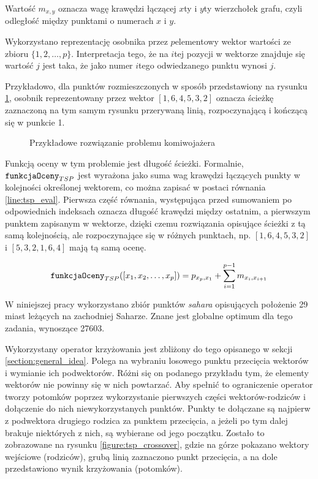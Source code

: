 \documentclass[./FM_mgr.tex]{subfiles}
\begin{document}
Wartość $m_{x, y}$ oznacza wagę krawędzi łączącej $x$ty i $y$ty wierzchołek grafu, czyli odległość między punktami o numerach $x$ i $y$.

Wykorzystano reprezentację osobnika przez $p$elementowy wektor wartości ze zbioru $\{ 1, 2, \ldots, p \}$.
Interpretacja tego, że na $i$tej pozycji w wektorze znajduje się wartość $j$ jest taka, że jako numer $i$tego odwiedzanego punktu wynosi $j$.

Przykładowo, dla punktów rozmieszczonych w sposób przedstawiony na rysunku \ref{figure:tsp_example}, osobnik reprezentowany przez wektor $[1, 6, 4, 5, 3, 2]$ oznacza ścieżkę zaznaczoną na tym samym rysunku przerywaną linią, rozpoczynającą i kończącą się w punkcie 1.

\begin{figure} [H]
	\caption{Przykładowe rozwiązanie problemu komiwojażera \label{figure:tsp_example}}
	\centering
\end{figure}

Funkcją oceny w tym problemie jest długość ścieżki. 
Formalnie, $\mathtt{funkcjaOceny}_{TSP}$ jest wyrażona jako suma wag krawędzi łączących punkty w kolejności określonej wektorem, co można zapisać w postaci równania \ref{line:tsp_eval}. 
Pierwsza część równania, występująca przed sumowaniem po odpowiednich indeksach oznacza długość krawędzi między ostatnim, a pierwszym punktem zapisanym w wektorze, dzięki czemu rozwiązania opisujące ścieżki z tą samą kolejnością, ale rozpoczynające się w różnych punktach, np. $[1, 6, 4, 5, 3, 2]$ i $[5, 3, 2, 1, 6, 4]$ mają tą samą ocenę.

\begin{align}
\mathtt{funkcjaOceny}_{TSP}([x_1, x_2, \ldots, x_p]) = p_{x_p, x_1} + \sum_{i=1}^{p-1} m_{x_i, x_{i+1}} \label{line:tsp_eval}
\end{align}

W niniejszej pracy wykorzystano zbiór punktów \emph{sahara} \cite{sahara_points} opisujących położenie 29 miast leżących na zachodniej Saharze. 
Znane jest globalne optimum dla tego zadania, wynoszące 27603.

Wykorzystany operator krzyżowania jest zbliżony do tego opisanego w sekcji \ref{section:general_idea}. 
Polega na wybraniu losowego punktu przecięcia wektorów i wymianie ich podwektorów. 
Różni się on podanego przykładu tym, że elementy wektorów nie powinny się w nich powtarzać.
Aby spełnić to ograniczenie operator tworzy potomków poprzez wykorzystanie pierwszych części wektorów-rodziców i dołączenie do nich niewykorzystanych punktów.
Punkty te dołączane są najpierw z podwektora drugiego rodzica za punktem przecięcia, a jeżeli po tym dalej brakuje niektórych z nich, są wybierane od jego początku.
Zostało to zobrazowane na rysunku \ref{figure:tsp_crossover}, gdzie na górze pokazano wektory wejściowe (rodziców), grubą linią zaznaczono punkt przecięcia, a na dole przedstawiono wynik krzyżowania (potomków).
\end{document}

